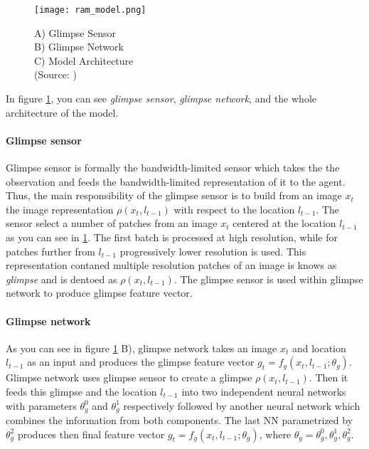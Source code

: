 \begin{figure}[H]
	\texttt{[image: ram\_model.png]}
	\caption{
		A) Glimpse Sensor \\
		B) Glimpse Network \\
		C) Model Architecture \\
		(Source: \cite{Ba2015})
	}
	\label{img:ram_model}
\end{figure}

In figure \ref{img:ram_model}, you can see
\emph{glimpse sensor}, \emph{glimpse network}, and the whole architecture
of the model.

\paragraph{Glimpse sensor} Glimpse sensor is formally the bandwidth-limited sensor
which takes the the observation and feeds the bandwidth-limited representation of it to
the agent.
Thus, the main responsibility of the glimpse sensor
is to build from an image $x_t$ the image representation $\rho(x_t, l_{t-1})$
with respect to the location $l_{t-1}$. The sensor select a number of patches
 from an image $x_t$ centered at the location $l_{t-1}$ as you can see in \ref{img:ram_model}.
 The first batch is processed at high resolution, while for patches further
 from $l_{t-1}$ progressively lower resolution is used. This representation contaned
 multiple resolution patches
 of an image is knows as \emph{glimpse} and is dentoed as $\rho(x_t, l_{t-1})$. \cite{Larochelle2010}
 The glimpse sensor is used within glimpse network to produce
  glimpse feature vector.



%
%
%


\paragraph{Glimpse network} As you can see in figure \ref{img:ram_model} B),
glimpse network takes an image $x_t$ and
location $l_{t-1}$ as an input and produces the glimpse feature vector
$g_t = f_g (x_t, l_{t-1}; \theta_g)$. Glimpse network uses glimpse sensor to
create a glimpse $\rho(x_t, l_{t-1})$. Then it feeds this glimpse and the location
$l_{t-1}$ into two independent neural networks with parameters $\theta_g^0$ and $\theta_g^1$
respectively followed by another neural network which combines the information
from both components. The last NN parametrized by $\theta_g^2$ produces then
final feature vector $g_t = f_g (x_t, l_{t-1}; \theta_g)$,
where $\theta_g = {\theta_g^0, \theta_g^1, \theta_g^2}$.

